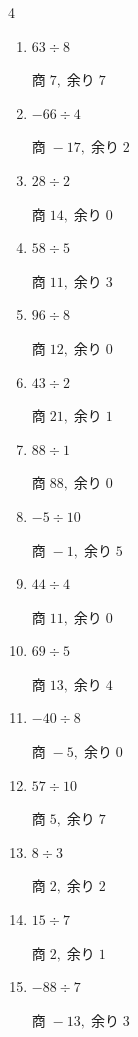 \begin{multicols}{4}
\begin{enumerate}
        $商\; -12,\; 余り\; 5$

  \item $63 \div 8$

        $商\; 7,\; 余り\; 7$

  \item $-66 \div 4$

        $商\; -17,\; 余り\; 2$

  \item $28 \div 2$

        $商\; 14,\; 余り\; 0$

  \item $58 \div 5$

        $商\; 11,\; 余り\; 3$

  \item $96 \div 8$

        $商\; 12,\; 余り\; 0$

  \item $43 \div 2$

        $商\; 21,\; 余り\; 1$

  \item $88 \div 1$

        $商\; 88,\; 余り\; 0$

  \item $-5 \div 10$

        $商\; -1,\; 余り\; 5$

  \item $44 \div 4$

        $商\; 11,\; 余り\; 0$

  \item $69 \div 5$

        $商\; 13,\; 余り\; 4$

  \item $-40 \div 8$

        $商\; -5,\; 余り\; 0$

  \item $57 \div 10$

        $商\; 5,\; 余り\; 7$

  \item $8 \div 3$

        $商\; 2,\; 余り\; 2$

  \item $15 \div 7$

        $商\; 2,\; 余り\; 1$

  \item $-88 \div 7$

        $商\; -13,\; 余り\; 3$


\end{enumerate}
\end{multicols}
